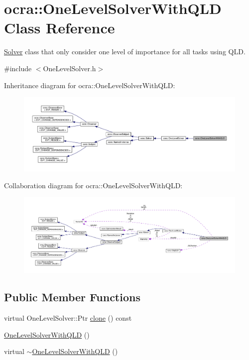 \hypertarget{classocra_1_1OneLevelSolverWithQLD}{}\section{ocra\+:\+:One\+Level\+Solver\+With\+Q\+LD Class Reference}
\label{classocra_1_1OneLevelSolverWithQLD}


\hyperlink{classocra_1_1Solver}{Solver} class that only consider one level of importance for all tasks using Q\+LD.  




{\ttfamily \#include $<$One\+Level\+Solver.\+h$>$}



Inheritance diagram for ocra\+:\+:One\+Level\+Solver\+With\+Q\+LD\+:\nopagebreak
\begin{figure}[H]
\begin{center}
\leavevmode
\includegraphics[width=350pt]{d8/d50/classocra_1_1OneLevelSolverWithQLD__inherit__graph}
\end{center}
\end{figure}


Collaboration diagram for ocra\+:\+:One\+Level\+Solver\+With\+Q\+LD\+:\nopagebreak
\begin{figure}[H]
\begin{center}
\leavevmode
\includegraphics[width=350pt]{dc/d3a/classocra_1_1OneLevelSolverWithQLD__coll__graph}
\end{center}
\end{figure}
\subsection*{Public Member Functions}
\begin{DoxyCompactItemize}
\item 
virtual One\+Level\+Solver\+::\+Ptr \hyperlink{classocra_1_1OneLevelSolverWithQLD_a8dc1522a50198d0120de3b29e94d66e8}{clone} () const
\item 
\hyperlink{classocra_1_1OneLevelSolverWithQLD_a75cf75293c527be3cbafb379bcddd758}{One\+Level\+Solver\+With\+Q\+LD} ()
\item 
virtual \hyperlink{classocra_1_1OneLevelSolverWithQLD_aaedebe9fe695e3bca4a9010b88386fcc}{$\sim$\+One\+Level\+Solver\+With\+Q\+LD} ()
\end{DoxyCompactItemize}
